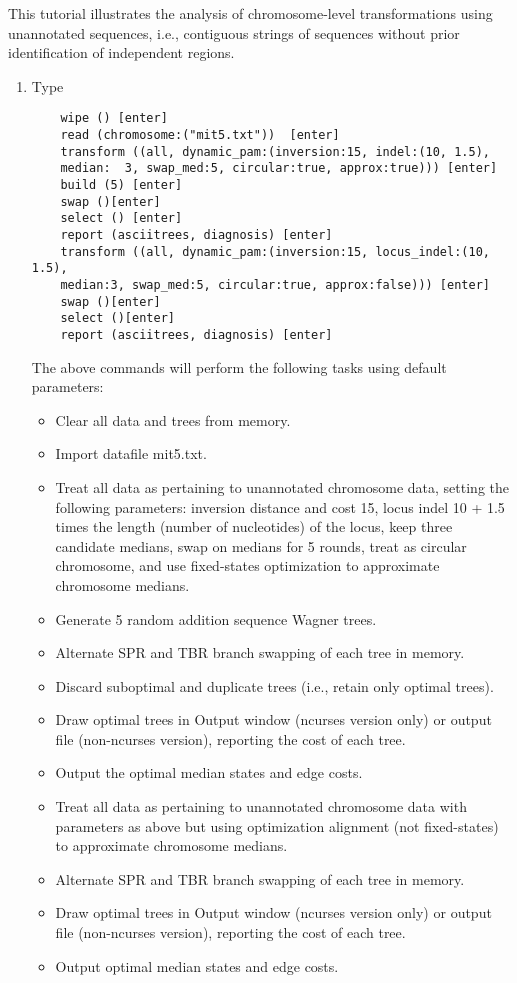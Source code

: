 This tutorial illustrates the analysis of chromosome-level transformations using 
unannotated sequences, i.e., contiguous strings of sequences without prior 
identification of independent regions.
\begin{enumerate}
    \item Type
    \begin{verbatim}
    wipe () [enter]
    read (chromosome:("mit5.txt"))  [enter]
    transform ((all, dynamic_pam:(inversion:15, indel:(10, 1.5), 
    median:  3, swap_med:5, circular:true, approx:true))) [enter]
    build (5) [enter]
    swap ()[enter]
    select () [enter]
    report (asciitrees, diagnosis) [enter]
    transform ((all, dynamic_pam:(inversion:15, locus_indel:(10, 1.5), 
    median:3, swap_med:5, circular:true, approx:false))) [enter]
    swap ()[enter]
    select ()[enter]
    report (asciitrees, diagnosis) [enter]
    \end{verbatim}

The above commands will perform the following tasks using default parameters:
\begin{itemize}
    \item Clear all data and trees from memory.
    \item Import datafile mit5.txt.
    \item Treat all data as pertaining to unannotated chromosome data, setting the 
        following parameters: inversion distance and cost 15, locus indel 10 + 1.5 
        times the length (number of nucleotides) of the locus, keep three 
        candidate medians, swap on medians for 5 rounds, treat as circular 
        chromosome, and use fixed-states optimization to approximate chromosome 
        medians.
    \item Generate 5 random addition sequence Wagner trees.
    \item Alternate SPR and TBR branch swapping of each tree in memory.
    \item Discard suboptimal and duplicate trees (i.e., retain only optimal trees).
    \item Draw optimal trees in \poy Output window (ncurses version only) or output 
        file (non-ncurses version), reporting the cost of each tree.
    \item Output the optimal median states and edge costs.
    \item Treat all data as pertaining to unannotated chromosome data with 
        parameters as above but using optimization alignment (not fixed-states) to 
        approximate chromosome medians.   
    \item Alternate SPR and TBR branch swapping of each tree in memory.
    \item Draw optimal trees in \poy Output window (ncurses version only) or output 
        file (non-ncurses version), reporting the cost of each tree.
    \item Output optimal median states and edge costs.
\end{itemize}
\end{enumerate}
